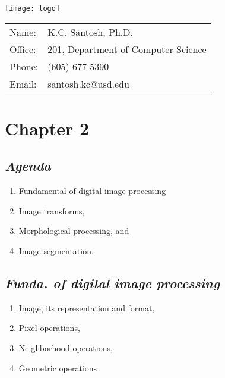 \documentclass{response}
\begin{document}
\maketitle
\pagecolor{gray!5}

\texttt{[image: logo]}\\
\vspace*{1cm}

\renewcommand{\tabcolsep}{1em}
\begin{tabular}{ll}
Name: & K.C. Santosh, Ph.D.\\
Office: & 201, Department of Computer Science \\
Phone: & (605) 677-5390\\
Email: & santosh.kc@usd.edu 
\end{tabular}

\vfill

\section*{\Huge Chapter 2} 






\newpage

\subsection*{\Huge\em Agenda }
\bigskip

{\large 

\begin{enumerate}\setlength\itemsep{-0.5em}
\item Fundamental of digital image processing 
\item Image transforms,
\item Morphological processing, and
\item Image segmentation.
\end{enumerate}
}


\newpage

\subsection*{\huge \em Funda. of digital image processing }
\bigskip


{\large 
\begin{enumerate}\setlength\itemsep{-0.5em}
\item Image, its representation and format,
\item Pixel operations,
\item Neighborhood operations,
\item Geometric operations
\end{enumerate}

}
\end{document}
